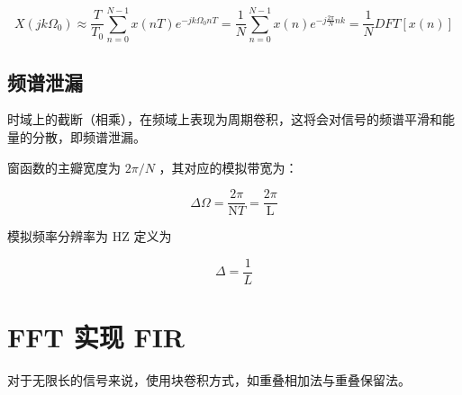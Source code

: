 \documentclass[cn,11pt,chinese,black,simple]{../elegantbook}
\begin{document}
\[
X\left(j k \Omega_{0}\right) \approx \frac{T}{T_{0}} \sum_{n=0}^{N-1} x(n T) e^{-j k \Omega_{0} n T}=\frac{1}{N} \sum_{n=0}^{N-1} x(n) e^{-j \frac{2 \pi}{N} n k}=\frac{1}{N} D F T[x(n)]
\]


\subsection{频谱泄漏}

时域上的截断（相乘），在频域上表现为周期卷积，这将会对信号的频谱平滑和能量的分散，即频谱泄漏。

窗函数的主瓣宽度为 \(2\pi / N\) ，其对应的模拟带宽为：

\[
\Delta \Omega=\frac{2 \pi}{\mathrm{N} T}=\frac{2 \pi}{\mathrm{L}}
\]

模拟频率分辨率为 HZ 定义为 

\[\Delta = \frac{1}{L}\] 

\section{FFT 实现 FIR}

对于无限长的信号来说，使用块卷积方式，如重叠相加法与重叠保留法。


\let\chapname\undefined
\ifx\mainclass\undefined
\end{document}
